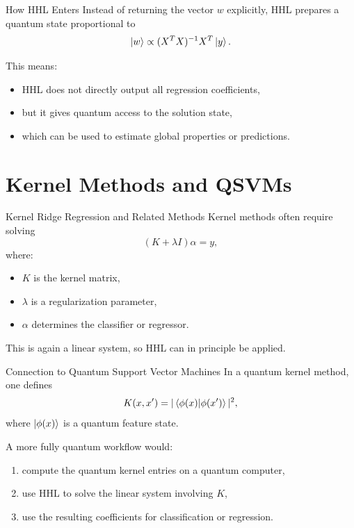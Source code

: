 \documentclass{beamer}
\begin{document}

\begin{frame}{How HHL Enters}
Instead of returning the vector \(w\) explicitly, HHL prepares a quantum state proportional to
\[
\ket{w} \propto (X^T X)^{-1} X^T \ket{y}.
\]

This means:
\begin{itemize}
\item HHL does not directly output all regression coefficients,
\item but it gives quantum access to the solution state,
\item which can be used to estimate global properties or predictions.
\end{itemize}
\end{frame}

\section{Kernel Methods and QSVMs}

\begin{frame}{Kernel Ridge Regression and Related Methods}
Kernel methods often require solving
\[
(K + \lambda I)\alpha = y,
\]
where:
\begin{itemize}
\item \(K\) is the kernel matrix,
\item \(\lambda\) is a regularization parameter,
\item \(\alpha\) determines the classifier or regressor.
\end{itemize}

This is again a linear system, so HHL can in principle be applied.
\end{frame}


\begin{frame}{Connection to Quantum Support Vector Machines}
In a quantum kernel method, one defines
\[
K(x,x') = |\braket{\phi(x)}{\phi(x')}|^2,
\]
where \(\ket{\phi(x)}\) is a quantum feature state.

A more fully quantum workflow would:
\begin{enumerate}
\item compute the quantum kernel entries on a quantum computer,
\item use HHL to solve the linear system involving \(K\),
\item use the resulting coefficients for classification or regression.
\end{enumerate}
\end{frame}
\end{document}
